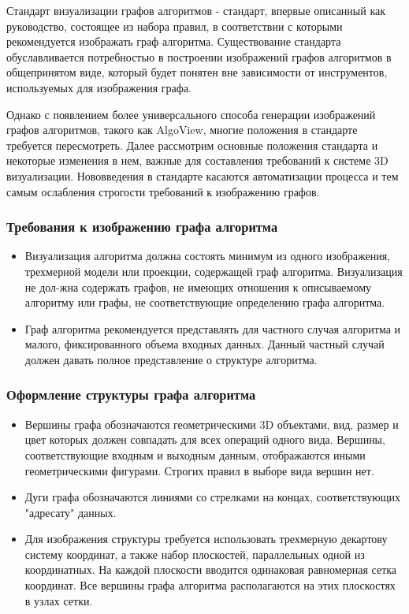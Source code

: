 Стандарт визуализации графов алгоритмов - стандарт, впервые описанный как руководство, состоящее из набора правил, в соответствии с которыми рекомендуется изображать граф алгоритма. Существование стандарта обуславливается потребностью в построении изображений графов алгоритмов в общепринятом виде, который будет понятен вне зависимости от инструментов, используемых для изображения графа. \cite{AlgoWiki_standart}

Однако с появлением более универсального способа генерации изображений графов алгоритмов, такого как AlgoView, многие положения в стандарте требуется пересмотреть. Далее рассмотрим основные положения стандарта и некоторые изменения в нем, важные для составления требований к системе 3D визуализации. Нововведения в стандарте касаются автоматизации процесса и тем самым ослабления строгости требований к изображению графов.

\subsubsection{Требования к изображению графа алгоритма}

\begin{itemize}
    \item Визуализация алгоритма должна состоять минимум из одного изображения, трехмерной модели или проекции, содержащей граф алгоритма. Визуализация не дол-жна содержать графов, не имеющих отношения к описываемому алгоритму или графы, не соответствующие определению графа алгоритма.
    \item Граф алгоритма рекомендуется представлять для частного случая алгоритма и малого, фиксированного объема входных данных. Данный частный случай должен давать полное представление о структуре алгоритма.
\end{itemize}

\subsubsection{Оформление структуры графа алгоритма}

\begin{itemize}
    \item Вершины графа обозначаются геометрическими 3D объектами, вид, размер и цвет которых должен совпадать для всех операций одного вида. Вершины, соответствующие входным и выходным данным, отображаются иными геометрическими фигурами. Строгих правил в выборе вида вершин нет.
    \item Дуги графа обозначаются линиями со стрелками на концах, соответствующих "адресату" данных.
    \item Для изображения структуры требуется использовать трехмерную декартову систему координат, а также набор плоскостей, параллельных одной из координатных. На каждой плоскости вводится одинаковая равномерная сетка координат. Все вершины графа алгоритма располагаются на этих плоскостях в узлах сетки.
\end{itemize}


